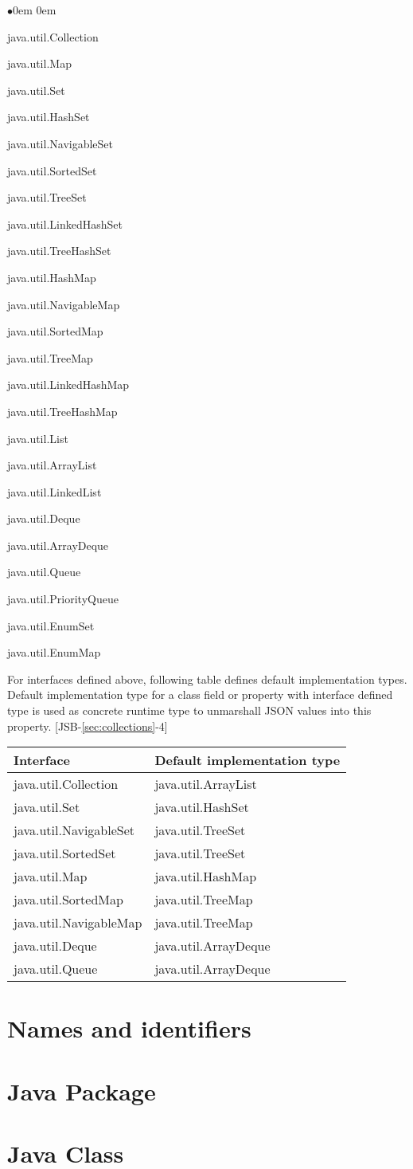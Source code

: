 \begin{list}{$\bullet$}{\parsep 0em  0em}
\item java.util.Collection
\item java.util.Map
\item java.util.Set
\item java.util.HashSet
\item java.util.NavigableSet
\item java.util.SortedSet
\item java.util.TreeSet
\item java.util.LinkedHashSet
\item java.util.TreeHashSet
\item java.util.HashMap
\item java.util.NavigableMap
\item java.util.SortedMap
\item java.util.TreeMap
\item java.util.LinkedHashMap
\item java.util.TreeHashMap
\item java.util.List
\item java.util.ArrayList
\item java.util.LinkedList
\item java.util.Deque
\item java.util.ArrayDeque
\item java.util.Queue
\item java.util.PriorityQueue
\item java.util.EnumSet
\item java.util.EnumMap
\end{list}
For interfaces defined above, following table defines default implementation types. Default implementation type for a class field or property with interface defined type is used as concrete runtime type to unmarshall JSON values into this property. [JSB-\ref{sec:collections}-4]

\begin{tabularx}{\textwidth}{ |X|X| }
\hline
Interface & Default implementation type \\ 
\hline
java.util.Collection & java.util.ArrayList \\
java.util.Set & java.util.HashSet \\
java.util.NavigableSet & java.util.TreeSet \\
java.util.SortedSet & java.util.TreeSet \\
java.util.Map & java.util.HashMap \\
java.util.SortedMap & java.util.TreeMap \\
java.util.NavigableMap & java.util.TreeMap \\
java.util.Deque & java.util.ArrayDeque \\
java.util.Queue & java.util.ArrayDeque \\
\hline
\end{tabularx}

\section{Names and identifiers}

\section{Java Package}

\section{Java Class}
